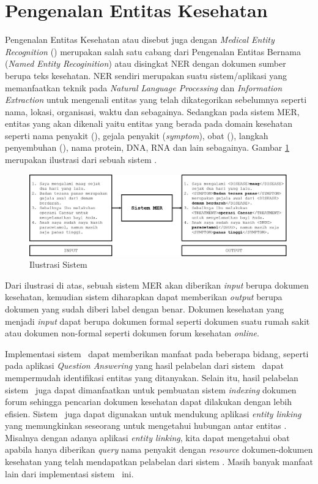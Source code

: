 \section{Pengenalan Entitas Kesehatan}\label{aboutmer}
Pengenalan Entitas Kesehatan atau disebut juga dengan \textit{Medical Entity Recognition} (\mer) merupakan salah satu cabang dari Pengenalan Entitas Bernama (\textit{Named Entity Recoginition}) atau disingkat NER dengan dokumen sumber berupa teks kesehatan. NER sendiri merupakan suatu sistem/aplikasi yang memanfaatkan teknik pada \textit{Natural Language Processing} dan \textit{Information Extraction} untuk mengenali entitas yang telah dikategorikan sebelumnya seperti nama, lokasi, organisasi, waktu dan sebagainya. Sedangkan pada sistem MER, entitas yang akan dikenali yaitu entitas yang berada pada domain kesehatan seperti nama penyakit (\textit{\disease}), gejala penyakit (\textit{symptom}), obat (\textit{\drug}), langkah penyembuhan (\textit{\treatment}), nama protein, DNA, RNA dan lain sebagainya. Gambar \ref{fig:mer_ilustration} merupakan ilustrasi dari sebuah sistem \mer.

\begin{figure}
	\centering
	\includegraphics[width=1.0\linewidth]{images/mer_ilustration}
	\caption{Ilustrasi Sistem \mer}
	\label{fig:mer_ilustration}
\end{figure}

Dari ilustrasi di atas, sebuah sistem MER akan diberikan \textit{input} berupa dokumen kesehatan, kemudian sistem diharapkan dapat memberikan \textit{output} berupa dokumen yang sudah diberi label dengan benar. Dokumen kesehatan yang menjadi \textit{input} dapat berupa dokumen formal seperti dokumen suatu rumah sakit atau dokumen non-formal seperti dokumen forum kesehatan \textit{online}.

Implementasi sistem \mer~dapat memberikan manfaat pada beberapa bidang, seperti pada aplikasi \textit{Question Answering} \citep{abacha2011medical} yang hasil pelabelan dari sistem \mer~dapat mempermudah identifikasi entitas yang ditanyakan. Selain itu, hasil pelabelan sistem \mer~juga dapat dimanfaatkan untuk pembuatan sistem \textit{indexing} dokumen forum sehingga pencarian dokumen kesehatan dapat dilakukan dengan lebih efisien. Sistem \mer~juga dapat digunakan untuk mendukung aplikasi \textit{entity linking} yang memungkinkan seseorang untuk mengetahui hubungan antar entitas \citep{hachey2013evaluating}. Misalnya dengan adanya aplikasi \textit{entity linking}, kita dapat mengetahui obat apabila hanya diberikan \textit{query} nama penyakit dengan \textit{resource} dokumen-dokumen kesehatan yang telah mendapatkan pelabelan dari sistem \mer. Masih banyak manfaat lain dari implementasi sistem \mer~ini.

